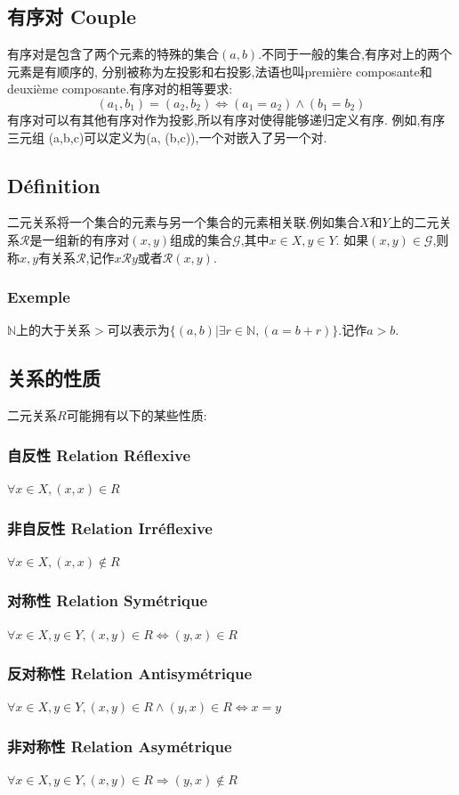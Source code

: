 \documentclass[12pt, a4paper, oneside]{ctexbook}
\begin{document}
  \subsection{有序对 Couple}
  有序对是包含了两个元素的特殊的集合$(a,b)$.不同于一般的集合,有序对上的两个元素是有顺序的,
  分别被称为左投影和右投影,法语也叫première composante和deuxième composante.有序对的相等要求:
  $$
  (a_1,b_1)=(a_2,b_2)\Leftrightarrow (a_1=a_2)\land(b_1=b_2)
  $$有序对可以有其他有序对作为投影,所以有序对使得能够递归定义有序.
  例如,有序三元组 (a,b,c)可以定义为(a, (b,c)),一个对嵌入了另一个对.
  \subsection{Définition}
  二元关系将一个集合的元素与另一个集合的元素相关联.例如集合$X$和$Y$上的二元关系$\mathcal{R} $是一组新的有序对$(x,y)\text{组成的集合$\mathcal{G} $,其中}x\in X,y\in Y$.
  如果$(x,y)\in\mathcal{G}$,则称$x,y$有关系$\mathcal{R}$,记作$x\mathcal{R}y$或者$\mathcal{R}(x,y)$.
  \subsubsection{Exemple}
  $\mathbb{N}$上的大于关系$>$可以表示为$\{(a,b)|\exists r\in \mathbb{N},(a=b+r)\}$.记作$a>b$.
  \subsection{关系的性质}
  二元关系$R$可能拥有以下的某些性质:
  \subsubsection{自反性 Relation Réflexive}
  $\forall x\in X,(x,x)\in R$
  \subsubsection{非自反性 Relation Irréflexive}
  $\forall x\in X,(x,x)\notin R$
  \subsubsection{对称性 Relation Symétrique}
  $\forall x\in X,y\in Y,(x,y)\in R\Leftrightarrow(y,x)\in R$
  \subsubsection{反对称性 Relation Antisymétrique}
  $\forall x\in X,y\in Y,(x,y)\in R\land(y,x)\in R \Leftrightarrow x= y$
  \subsubsection{非对称性 Relation Asymétrique}
  $\forall x\in X,y\in Y,(x,y)\in R\Rightarrow (y,x)\notin R$
\end{document}
